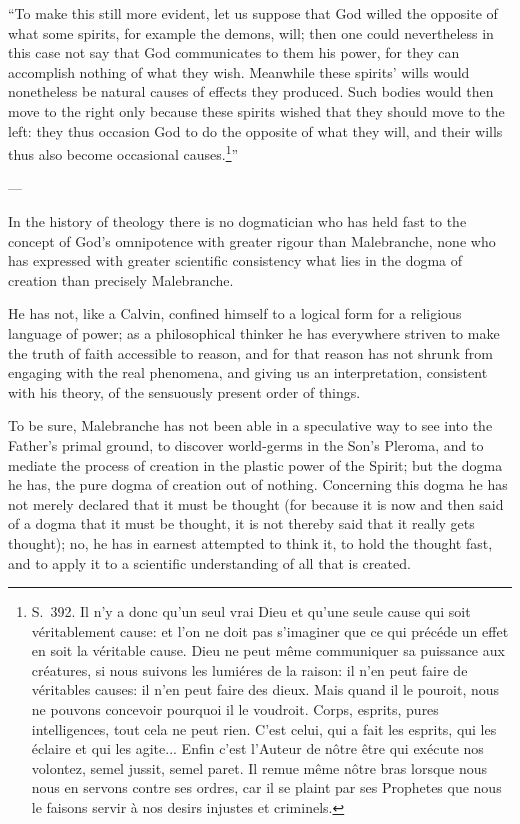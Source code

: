 \documentclass[12pt,a4paper]{article}
\begin{document}
``To make this still more evident, let us suppose that God willed the opposite of
what some spirits, for example the demons, will; then one could nevertheless in
this case not say that God communicates to them his power, for they can accomplish
nothing of what they wish. Meanwhile these spirits' wills would nonetheless be
natural causes of effects they produced. Such bodies would then move to the right
only because these spirits wished that they should move to the left: they thus
occasion God to do the opposite of what they will, and their wills thus also
become occasional causes.\footnote{S.~392. Il n'y a donc qu'un seul vrai Dieu et
qu'une seule cause qui soit véritablement cause: et l'on ne doit pas s'imaginer que
ce qui précéde un effet en soit la véritable cause. Dieu ne peut même communiquer
sa puissance aux créatures, si nous suivons les lumiéres de la raison: il n'en peut
faire de véritables causes: il n'en peut faire des dieux. Mais quand il le pouroit,
nous ne pouvons concevoir pourquoi il le voudroit. Corps, esprits, pures
intelligences, tout cela ne peut rien. C'est celui, qui a fait les esprits, qui
les éclaire et qui les agite... Enfin c'est l'Auteur de nôtre être qui exécute nos
volontez, semel jussit, semel paret. Il remue même nôtre bras lorsque nous nous en
servons contre ses ordres, car il se plaint par ses Prophetes que nous le faisons
servir à nos desirs injustes et criminels.}''

\begin{center}---\end{center}

In the history of theology there is no dogmatician who has held fast to the concept
of God's omnipotence with greater rigour than Malebranche, none who has expressed
with greater scientific consistency what lies in the dogma of creation than
precisely Malebranche.

He has not, like a Calvin, confined himself to a logical form for a religious
language of power; as a philosophical thinker he has everywhere striven to make the
truth of faith accessible to reason, and for that reason has not shrunk from
engaging with the real phenomena, and giving us an interpretation, consistent with
his theory, of the sensuously present order of things.

To be sure, Malebranche has not been able in a speculative way to see
into the Father's primal ground, to discover world-germs in the Son's Pleroma, and
to mediate the process of creation in the plastic power of the Spirit; but the
dogma he has, the pure dogma of creation out of nothing. Concerning this dogma he
has not merely declared that it must be thought (for because it is now and then
said of a dogma that it must be thought, it is not thereby said that it really gets
thought); no, he has in earnest attempted to think it, to hold the thought fast,
and to apply it to a scientific understanding of all that is created.
\end{document}
